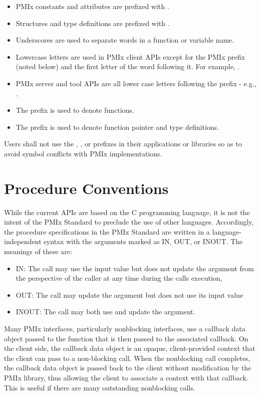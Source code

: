 \begin{itemize}
\item \ac{PMIx} constants and attributes are prefixed with \textbf{}.
\item Structures and type definitions are prefixed with .
\item Underscores are used to separate words in a function or variable name.
\item Lowercase letters are used in \ac{PMIx} client \acp{API} except for the \ac{PMIx} prefix (noted below) and the first letter of the word following it.
For example, .
\item \ac{PMIx} server and tool \acp{API} are all lower case letters following the prefix - e.g., .
\item The  prefix is used to denote functions.
\item The  prefix is used to denote function pointer and type definitions.
\end{itemize}

Users shall not use the \textbf{}, \textbf{}, or \textbf{} prefixes in their applications or libraries so as to avoid symbol conflicts with \ac{PMIx} implementations.

\section{Procedure Conventions}

While the current \acp{API} are based on the C programming language, it is not the intent of the \ac{PMIx} Standard to preclude the use of other languages.
Accordingly, the procedure specifications in the \ac{PMIx} Standard are written in a language-independent syntax with the arguments marked as IN, OUT, or INOUT.
The meanings of these are:
\begin{itemize}
\item IN:
The call may use the input value but does not update the argument from the perspective of the caller at any time during the calls execution,
\item OUT:
The call may update the argument but does not use its input value
\item INOUT:
The call may both use and update the argument.
\end{itemize}

Many \ac{PMIx} interfaces, particularly nonblocking interfaces, use a  callback data object passed to the function that is then passed to the associated callback. On the client side, the callback data object is an opaque, client-provided context that the client can pass to a non-blocking call. When the nonblocking call completes, the callback data object is passed back to the client without modification by the \ac{PMIx} library, thus allowing the client to associate a context with that callback. This is useful if there are many outstanding nonblocking calls.

